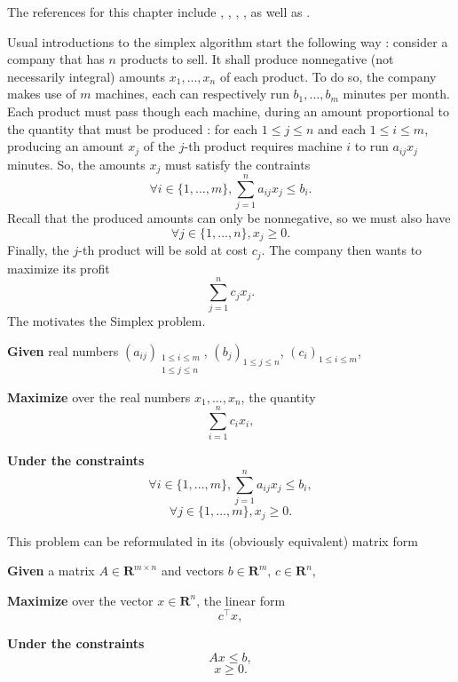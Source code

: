 The references for this chapter include \cite{hurlbert2009}, \cite{dantzig1997}, \cite{dantzig2002}, \cite{chvatal1983}, as well as \cite{karmarkar1984}.

Usual introductions to the simplex algorithm start the following way : consider a company that has $ n $ products to sell. It shall produce nonnegative (not necessarily integral) amounts $ x_1,...,x_n $ of each product. To do so, the company makes use of $ m $ machines, each can respectively run $ b_1, ..., b_m $ minutes per month. Each product must pass though each machine, during an amount proportional to the quantity that must be produced : for each $ 1 \le j \le n $ and each $ 1 \le i \le m $, producing an amount $ x_j $ of the $ j $-th product requires machine $ i $ to run $ a_{ij}x_j $ minutes. So, the amounts $ x_j $ must satisfy the contraints
\[
    \forall i \in \{ 1,...,m \}, \sum_{j=1}^n a_{ij} x_j \leqslant b_i.
\]
Recall that the produced amounts can only be nonnegative, so we must also have
\[
    \forall j \in \{ 1,...,n \}, x_j \geqslant 0.
\]
Finally, the $ j $-th product will be sold at cost $ c_j $. The company then wants to maximize its profit
\[
    \sum_{j=1}^n c_j x_j.
\]
The motivates the Simplex problem.

\begin{problem}
    \textbf{Given} real numbers $ (a_{ij})_{\substack{1 \leq i \leq m \\ 1 \leq j \leq n}} $, $ (b_j)_{1 \leq j \leq n} $, $ (c_i)_{1 \leq i \leq m} $,

    \textbf{Maximize} over the real numbers $ x_1, ..., x_n $, the quantity
    \[
        \sum_{i=1}^n c_i x_i,
    \]

    \textbf{Under the constraints}
    \[
        \forall i \in \{ 1, ..., m \}, \sum_{j=1}^n a_{ij} x_j \leqslant b_i,
    \]
    \[
        \forall j \in \{ 1, ..., m \}, x_j \geqslant 0.
    \]
\end{problem}

This problem can be reformulated in its (obviously equivalent) matrix form

\begin{problem}
    \textbf{Given} a matrix $ A \in \mathbf R^{m \times n} $ and vectors $ b \in \mathbf R^m $, $ c \in \mathbf R^n $,

    \textbf{Maximize} over the vector $ x \in \mathbf R^n $, the linear form
    \[
        c^\top x,
    \]

    \textbf{Under the constraints}
    \[
        Ax \leqslant b,
    \]
    \[
        x \geqslant 0.
    \]
\end{problem}

